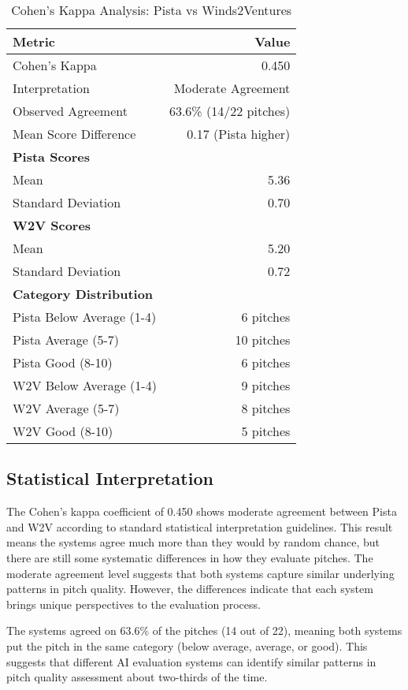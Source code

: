 \begin{table}[h]
\centering
\caption{Cohen's Kappa Analysis: Pista vs Winds2Ventures}
\label{tab:cohens-kappa}
\begin{tabular}{lr}
\hline
\textbf{Metric} & \textbf{Value} \\
\hline
Cohen's Kappa & 0.450 \\
Interpretation & Moderate Agreement \\
Observed Agreement & 63.6\% (14/22 pitches) \\
Mean Score Difference & 0.17 (Pista higher) \\
\hline
\textbf{Pista Scores} & \\
Mean & 5.36 \\
Standard Deviation & 0.70 \\
\hline
\textbf{W2V Scores} & \\
Mean & 5.20 \\
Standard Deviation & 0.72 \\
\hline
\textbf{Category Distribution} & \\
Pista Below Average (1-4) & 6 pitches \\
Pista Average (5-7) & 10 pitches \\
Pista Good (8-10) & 6 pitches \\
W2V Below Average (1-4) & 9 pitches \\
W2V Average (5-7) & 8 pitches \\
W2V Good (8-10) & 5 pitches \\
\hline
\end{tabular}
\end{table}

\subsection{Statistical Interpretation}

The Cohen's kappa coefficient of 0.450 shows moderate agreement between Pista and W2V according to standard statistical interpretation guidelines. This result means the systems agree much more than they would by random chance, but there are still some systematic differences in how they evaluate pitches. The moderate agreement level suggests that both systems capture similar underlying patterns in pitch quality. However, the differences indicate that each system brings unique perspectives to the evaluation process.

The systems agreed on 63.6\% of the pitches (14 out of 22), meaning both systems put the pitch in the same category (below average, average, or good). This suggests that different AI evaluation systems can identify similar patterns in pitch quality assessment about two-thirds of the time.

